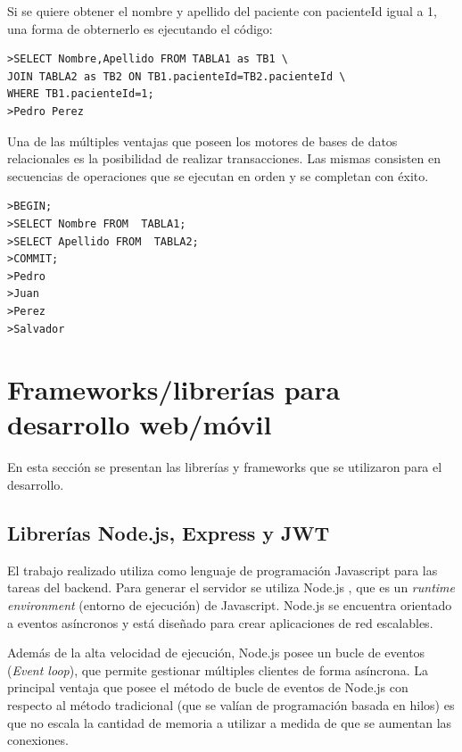 Si se quiere obtener el nombre y apellido del paciente con pacienteId igual a 1, una forma de obternerlo es ejecutando el código:

\begin{lstlisting}[label=código:SQL:vControl,caption=Ejecución de comando SQL.]  
>SELECT Nombre,Apellido FROM TABLA1 as TB1 \
JOIN TABLA2 as TB2 ON TB1.pacienteId=TB2.pacienteId \
WHERE TB1.pacienteId=1;
>Pedro Perez
\end{lstlisting}

Una de las múltiples ventajas que poseen los motores de bases de datos relacionales es la posibilidad de realizar transacciones. Las mismas consisten en secuencias de operaciones que se ejecutan en orden y se completan con éxito.

\begin{lstlisting}[label=código:SQL2:vControl,caption=Secuencia de transacción SQL.]  
>BEGIN;
>SELECT Nombre FROM  TABLA1;
>SELECT Apellido FROM  TABLA2;
>COMMIT;
>Pedro 
>Juan
>Perez
>Salvador
\end{lstlisting}




\section{Frameworks/librerías para desarrollo web/móvil}

En esta sección se presentan las librerías y frameworks que se utilizaron para el desarrollo.

\subsection{Librerías Node.js, Express y JWT}
\label{subsec: Node}
El trabajo realizado utiliza como lenguaje de programación  Javascript para las tareas del backend. Para generar el servidor se utiliza Node.js \citep{WEBSITE:20}, que es un \textit{runtime environment} (entorno de ejecución) de Javascript. Node.js se encuentra orientado a eventos asíncronos y está diseñado para crear aplicaciones de red escalables.

Además de la alta velocidad de ejecución, Node.js posee un bucle de eventos (\textit{Event loop}), que permite gestionar múltiples clientes de forma asíncrona. La principal ventaja que posee el método de bucle de eventos de Node.js con respecto al método tradicional (que se valían de programación basada en hilos) es que no escala la cantidad de memoria a utilizar a medida de que se aumentan las conexiones.

